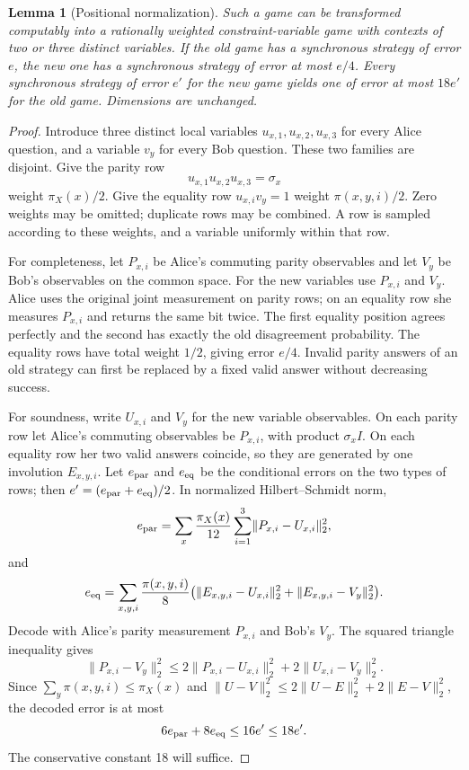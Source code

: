 \documentclass[11pt,a4paper]{article}
\newtheorem{lemma}[theorem]{Lemma}
\newcommand{\norm}[1]{\lVert#1\rVert}
\begin{document}
\begin{lemma}[Positional normalization]\label{lem:positions}
Such a game can be transformed computably into a rationally weighted constraint-variable game with contexts of two or three distinct variables. If the old game has a synchronous strategy of error $e$, the new one has a synchronous strategy of error at most $e/4$. Every synchronous strategy of error $e'$ for the new game yields one of error at most $18e'$ for the old game. Dimensions are unchanged.
\end{lemma}
\begin{proof}
Introduce three distinct local variables $u_{x,1},u_{x,2},u_{x,3}$ for every Alice question, and a variable $v_y$ for every Bob question. These two families are disjoint. Give the parity row
\[
 u_{x,1}u_{x,2}u_{x,3}=\sigma_x
\]
weight $\pi_X(x)/2$. Give the equality row $u_{x,i}v_y=1$ weight $\pi(x,y,i)/2$. Zero weights may be omitted; duplicate rows may be combined. A row is sampled according to these weights, and a variable uniformly within that row.

For completeness, let $P_{x,i}$ be Alice's commuting parity observables and let $V_y$ be Bob's observables on the common space. For the new variables use $P_{x,i}$ and $V_y$. Alice uses the original joint measurement on parity rows; on an equality row she measures $P_{x,i}$ and returns the same bit twice. The first equality position agrees perfectly and the second has exactly the old disagreement probability. The equality rows have total weight $1/2$, giving error $e/4$. Invalid parity answers of an old strategy can first be replaced by a fixed valid answer without decreasing success.

For soundness, write $U_{x,i}$ and $V_y$ for the new variable observables. On each parity row let Alice's commuting observables be $P_{x,i}$, with product $\sigma_x I$. On each equality row her two valid answers coincide, so they are generated by one involution $E_{x,y,i}$. Let $e_{\rm par}$ and $e_{\rm eq}$ be the conditional errors on the two types of rows; then $e'=(e_{\rm par}+e_{\rm eq})/2$. In normalized Hilbert--Schmidt norm,
\[
 e_{\rm par}=\sum_x\frac{\pi_X(x)}{12}
                  \sum_{i=1}^3\norm{P_{x,i}-U_{x,i}}_2^2,
\]
and
\[
 e_{\rm eq}=\sum_{x,y,i}\frac{\pi(x,y,i)}8
       \bigl(\norm{E_{x,y,i}-U_{x,i}}_2^2+
             \norm{E_{x,y,i}-V_y}_2^2\bigr).
\]
Decode with Alice's parity measurement $P_{x,i}$ and Bob's $V_y$. The squared triangle inequality gives
\[
 \norm{P_{x,i}-V_y}_2^2
 \le2\norm{P_{x,i}-U_{x,i}}_2^2+
     2\norm{U_{x,i}-V_y}_2^2.
\]
Since $\sum_y\pi(x,y,i)\le\pi_X(x)$ and
$\norm{U-V}_2^2\le2\norm{U-E}_2^2+2\norm{E-V}_2^2$,
the decoded error is at most
\[
 6e_{\rm par}+8e_{\rm eq}\le16e'\le18e'.
\]
The conservative constant 18 will suffice.
\end{proof}
\end{document}
